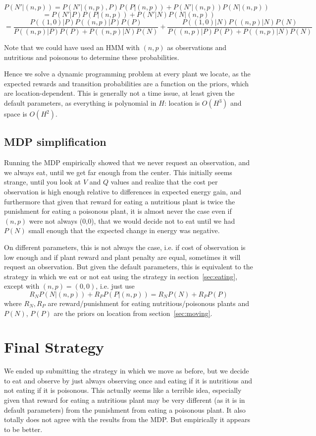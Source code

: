 \documentclass{article}
\begin{document}
\[P(N'|(n,p))=P(N'|(n,p),P)P(P|(n,p))+P(N'|(n,p))P(N|(n,p))\]
\[=P(N'|P)P(P|(n,p))+P(N'|N)P(N|(n,p))\]
\[=\frac{P((1,0)|P)P((n,p)|P)P(P)}{P((n,p)|P)P(P)+P((n,p)|N)P(N)} + \frac{P((1,0)|N)P((n,p)|N)P(N)}{P((n,p)|P)P(P)+P((n,p)|N)P(N)}\]

Note that we could have used an HMM with $(n,p)$ as observations 
and nutritious and poisonous to determine these probabilities. 

Hence we solve a dynamic programming problem at every plant we locate,
as the expected rewards and transition probabilities are a function on
the priors, which are location-dependent. This is generally not a time issue,
at least given the default parameters, 
as everything is polynomial in $H$: location is $O(H^3)$ and space is $O(H^2)$. 


\subsection{MDP simplification}
Running the MDP empirically showed that we never request an
observation, and we always eat, until we get far enough from the
center.  This initially seems strange, until you look at $V$ and $Q$
values and realize that the cost per observation is high enough
relative to differences in expected energy gain, and furthermore that
given that reward for eating a nutritious plant is twice the
punishment for eating a poisonous plant, it is almost never the case
even if $(n,p)$ were not always (0,0), that we would decide not to eat
until we had $P(N)$ small enough that the expected change in energy
was negative.

On different parameters, this is not always the case, i.e. if cost of
observation is low enough and if plant reward and plant penalty are
equal, sometimes it will request an observation. But given the default
parameters, this is equivalent to the strategy in which we eat or not
eat using the strategy in section~\ref{sec:eating}, except with
$(n,p)=(0,0)$, i.e.  just use
\[R_NP(N|(n,p))+R_PP(P|(n,p))=R_NP(N)+R_PP(P)\]
where $R_N,R_P$ are reward/punishment for eating nutritious/poisonous
plants and $P(N)$, $P(P)$ are the priors on location from
section~\ref{sec:moving}.


\section{Final Strategy}
We ended up submitting the strategy in which we move as before, but we
decide to eat and observe by just always observing once and eating if
it is nutritious and not eating if it is poisonous. This actually
seems like a terrible idea, especially given that reward for eating a
nutritious plant may be very different (as it is in default
parameters) from the punishment from eating a poisonous plant. It also
totally does not agree with the results from the MDP. But empirically
it appears to be better.
\end{document}
